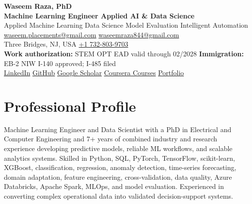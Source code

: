 \documentclass[9pt,letterpaper]{extarticle}
\begin{document}
\begin{center}
{\LARGE\bfseries Waseem Raza, PhD}{\normalsize\mdseries }\\[2pt]
{\large\bfseries Machine Learning Engineer \textbar{} Applied AI \& Data Science}\\[1pt]
{\small Applied Machine Learning \textbar{} Data Science \textbar{} Model Evaluation \textbar{} Intelligent Automation}\\[3pt]
{\footnotesize {}\enspace \href{mailto:waseem.placements@gmail.com}{waseem.placements@gmail.com} \textbar{} \href{mailto:waseemraza844@gmail.com}{waseemraza844@gmail.com}\\[1pt]Three Bridges, NJ, USA \quad {}\enspace \href{tel:+17328039703}{+1 732-803-9703}\\[1pt]{\scriptsize \textbf{Work authorization:} STEM OPT EAD valid through 02/2028 \textbar{} \textbf{Immigration:} EB-2 NIW I-140 approved; I-485 filed}\\[1pt]\href{https://www.linkedin.com/in/waseem-raza-phd-9a737858/}{LinkedIn} \textbar{} \href{https://github.com/WaseemRaza844}{GitHub} \textbar{} \href{https://scholar.google.com/citations?user=d58Drr0AAAAJ\&hl=en}{Google Scholar} \textbar{} \href{https://waseemraza844.github.io/portfolio/learning.html}{Coursera Courses} \textbar{} \href{https://waseemraza844.github.io/portfolio/}{Portfolio}}
\end{center}
\vspace{-5pt}
\section{Professional Profile}
Machine Learning Engineer and Data Scientist with a PhD in Electrical and Computer Engineering and 7+ years of combined industry and research experience developing predictive models, reliable ML workflows, and scalable analytics systems. Skilled in Python, SQL, PyTorch, TensorFlow, scikit-learn, XGBoost, classification, regression, anomaly detection, time-series forecasting, domain adaptation, feature engineering, cross-validation, data quality, Azure Databricks, Apache Spark, MLOps, and model evaluation. Experienced in converting complex operational data into validated decision-support systems.
\end{document}

